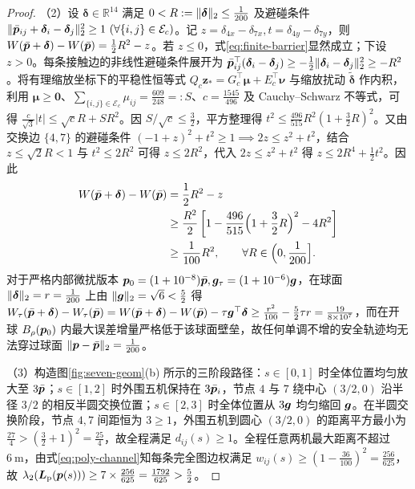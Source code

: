 \begin{proof}
（2）设 $\boldsymbol\delta\in\mathbb R^{14}$ 满足 $0<R:=\lVert\boldsymbol\delta\rVert_2\le\frac1{200}$ 及避碰条件 $\lVert\bar{\boldsymbol{p}}_{ij}+\boldsymbol\delta_i-\boldsymbol\delta_j\rVert_2^2\ge 1\ (\forall\{i,j\}\in\mathcal E_c)$。记 $z=\delta_{4x}-\delta_{7x},t=\delta_{4y}-\delta_{7y}$，则 $W(\bar{\boldsymbol{p}}+\boldsymbol\delta)-W(\bar{\boldsymbol{p}})=\frac12 R^2-z$。若 $z\le 0$，式\eqref{eq:finite-barrier}显然成立；下设 $z>0$。每条接触边的非线性避碰条件展开为 $\bar{\boldsymbol{p}}_{ij}^{\top}(\boldsymbol\delta_i-\boldsymbol\delta_j)\ge -\frac12\lVert\boldsymbol\delta_i-\boldsymbol\delta_j\rVert_2^2\ge -R^2$。将有理缩放坐标下的平稳性恒等式 $Q_c\boldsymbol z_*=G_c^{\top}\boldsymbol\mu+E_c^{\top}\boldsymbol\nu$ 与缩放扰动 $\tilde{\boldsymbol\delta}$ 作内积，利用 $\boldsymbol\mu\ge\boldsymbol 0$、$\sum_{\{i,j\}\in\mathcal E_c}\mu_{ij}=\frac{609}{248}=:S$、$c=\frac{1545}{496}$ 及 Cauchy–Schwarz 不等式，可得 $\frac{c}{\sqrt{3}}|t|\le\sqrt{c}R+SR^2$。因 $S/\sqrt{c}\le\frac32$，平方整理得 $t^2\le\frac{496}{515}R^2(1+\frac32 R)^2$。又由交换边 $\{4,7\}$ 的避碰条件 $(-1+z)^2+t^2\ge 1\implies 2z\le z^2+t^2$，结合 $z\le\sqrt{2}R<1$ 与 $t^2\le 2R^2$ 可得 $z\le 2R^2$，代入 $2z\le z^2+t^2$ 得 $z\le 2R^4+\frac12 t^2$。因此
\begin{equation}
\begin{split}
 W(\bar{\boldsymbol{p}}+\boldsymbol\delta)-W(\bar{\boldsymbol{p}})&=\frac12 R^2-z\\
 &\ge\frac{R^2}{2}\left[1-\frac{496}{515}\Big(1+\frac32 R\Big)^2-4R^2\right]\\
 &\ge\frac{1}{100}R^2,\qquad\forall R\in\Big(0,\frac1{200}\Big].
\end{split}
\end{equation}
对于严格内部微扰版本 $\boldsymbol{p}_0=(1+10^{-8})\bar{\boldsymbol{p}},\boldsymbol{g}_\tau=(1+10^{-6})\boldsymbol{g}$，在球面 $\lVert\boldsymbol\delta\rVert_2=r=\frac1{200}$ 上由 $\lVert\boldsymbol{g}\rVert_2=\sqrt{6}<\frac52$ 得 $W_\tau(\bar{\boldsymbol{p}}+\boldsymbol\delta)-W_\tau(\bar{\boldsymbol{p}})=W(\bar{\boldsymbol{p}}+\boldsymbol\delta)-W(\bar{\boldsymbol{p}})-\tau\boldsymbol{g}^{\top}\boldsymbol\delta\ge\frac{r^2}{100}-\frac52\tau r=\frac{19}{8\times 10^7}$，而在开球 $B_\rho(\boldsymbol{p}_0)$ 内最大误差增量严格低于该球面壁垒，故任何单调不增的安全轨迹均无法穿过球面 $\lVert\boldsymbol{p}-\bar{\boldsymbol{p}}\rVert_2=\frac1{200}$。

（3）构造图\ref{fig:seven-geom}(b) 所示的三阶段路径：$s\in[0,1]$ 时全体位置均匀放大至 $3\bar{\boldsymbol{p}}$；$s\in[1,2]$ 时外围五机保持在 $3\bar{\boldsymbol{p}}_i$，节点 $4$ 与 $7$ 绕中心 $(3/2,0)$ 沿半径 $3/2$ 的相反半圆交换位置；$s\in[2,3]$ 时全体位置从 $3\boldsymbol{g}$ 均匀缩回 $\boldsymbol{g}$。在半圆交换阶段，节点 $4,7$ 间距恒为 $3\ge 1$，外围五机到圆心 $(3/2,0)$ 的距离平方最小为 $\frac{27}{4}>(\frac32+1)^2=\frac{25}{4}$，故全程满足 $d_{ij}(s)\ge 1$。全程任意两机最大距离不超过 $6\ \mathrm m$，由式\eqref{eq:poly-channel}知每条完全图边权满足 $w_{ij}(s)\ge(1-\frac{36}{100})^2=\frac{256}{625}$，故 $\lambda_2(\boldsymbol{L}_{\mathrm{p}}(\boldsymbol{p}(s)))\ge 7\times\frac{256}{625}=\frac{1792}{625}>\frac52$。
\end{proof}

